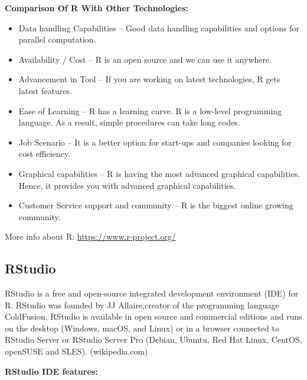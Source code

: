 \documentclass[]{book}
\providecommand{\tightlist}{%
  \setlength{\itemsep}{0pt}\setlength{\parskip}{0pt}}
\begin{document}
\textbf{Comparison Of R With Other Technologies:}

\begin{itemize}
\tightlist
\item
  Data handling Capabilities -- Good data handling capabilities and
  options for parallel computation.
\item
  Availability / Cost -- R is an open source and we can use it anywhere.
\item
  Advancement in Tool -- If you are working on latest technologies, R
  gets latest features.
\item
  Ease of Learning -- R has a learning curve. R is a low-level
  programming language. As a result, simple procedures can take long
  codes.
\item
  Job Scenario -- It is a better option for start-ups and companies
  looking for cost efficiency.
\item
  Graphical capabilities -- R is having the most advanced graphical
  capabilities. Hence, it provides you with advanced graphical
  capabilities.
\item
  Customer Service support and community -- R is the biggest online
  growing community.
\end{itemize}

More info about R: \url{https://www.r-project.org/}

\subsection{RStudio}\label{rstudio}

RStudio is a free and open-source integrated development environment
(IDE) for R. RStudio was founded by JJ Allaire,creator of the
programming language ColdFusion. RStudio is available in open source and
commercial editions and runs on the desktop (Windows, macOS, and Linux)
or in a browser connected to RStudio Server or RStudio Server Pro
(Debian, Ubuntu, Red Hat Linux, CentOS, openSUSE and SLES).
(wikipedia.com)

\textbf{RStudio IDE features: }
\end{document}

